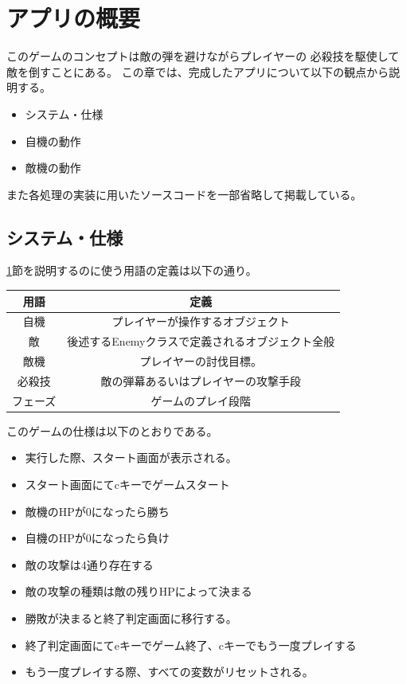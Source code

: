 \documentclass[a4paper,titlepage,11pt]{ltjsarticle}
\begin{document}
\section{アプリの概要}
\label{app_detail}
このゲームのコンセプトは敵の弾を避けながらプレイヤーの
必殺技を駆使して敵を倒すことにある。
この章では、完成したアプリについて以下の観点から説明する。
\begin{itemize}
	\item システム・仕様
	\item 自機の動作
	\item 敵機の動作
\end{itemize}
また各処理の実装に用いたソースコードを一部省略して掲載している。
\subsection{システム・仕様}
\ref{app_detail}節を説明するのに使う用語の定義は以下の通り。
\begin{table}[H]
	\begin{center}
		\begin{tabular}{|c|c|}
			\hline
			用語 & 定義 \\ \hline \hline 
			自機 & プレイヤーが操作するオブジェクト \\ \hline
			敵 & 後述するEnemyクラスで定義されるオブジェクト全般 \\ \hline
			敵機 & プレイヤーの討伐目標。 \\ \hline
			必殺技 & 敵の弾幕あるいはプレイヤーの攻撃手段\\ \hline
			フェーズ & ゲームのプレイ段階 \\ \hline
		\end{tabular}
	\end{center}
\end{table}
このゲームの仕様は以下のとおりである。
\begin{itemize}
	\item 実行した際、スタート画面が表示される。
	\item スタート画面にてcキーでゲームスタート
	\item 敵機のHPが0になったら勝ち
	\item 自機のHPが0になったら負け
	\item 敵の攻撃は4通り存在する
	\item 敵の攻撃の種類は敵の残りHPによって決まる
	\item 勝敗が決まると終了判定画面に移行する。
	\item 終了判定画面にてeキーでゲーム終了、cキーでもう一度プレイする
	\item もう一度プレイする際、すべての変数がリセットされる。
\end{itemize}
\end{document}
